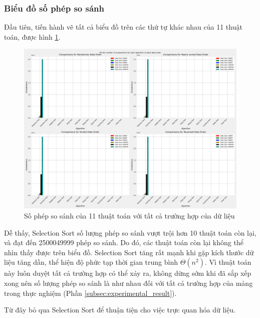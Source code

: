 \subsubsection{Biểu đồ số phép so sánh}

Đầu tiên, tiến hành vẽ tất cả biểu đồ trên các thứ tự khác nhau của 11 thuật toán, được hình \ref{fig:all_the_number_of_comparisons_for_each_algorithm_of_each_data_order}.

\begin{figure}[H]
    \centering
    \includegraphics[width=\textwidth]{experimental_result/images/all_the_number_of_comparisons_for_each_algorithm_of_each_data_order.png}
    \caption{Số phép so sánh của 11 thuật toán với tất cả trường hợp của dữ liệu}
    \label{fig:all_the_number_of_comparisons_for_each_algorithm_of_each_data_order}
\end{figure}

Dễ thấy, Selection Sort số lượng phép so sánh vượt trội hơn 10 thuật toán còn lại, và đạt đến 2500049999 phép so sánh. Do đó, các thuật toán còn lại không thể nhìn thấy được trên biểu đồ. Selection Sort tăng rất mạnh khi gặp kích thước dữ liệu tăng dần, thể hiện độ phức tạp thời gian trung bình $\Theta(n^2)$. Vì thuật toán này luôn duyệt tất cả trường hợp có thể xảy ra, không dừng sớm khi đã sắp xếp xong nên số lượng phép so sánh là như nhau đối với tất cả trường hợp của mảng trong thực nghiệm (Phần \ref{subsec:experimental_result}).  

Từ đây bỏ qua Selection Sort để thuận tiện cho việc trực quan hóa dữ liệu.


